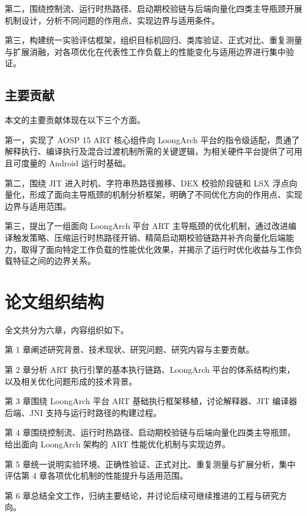 第二，围绕控制流、运行时热路径、启动期校验链与后端向量化四类主导瓶颈开展机制设计，分析不同问题的作用点、实现边界与适用条件。

第三，构建统一实验评估框架，组织目标机回归、类库验证、正式对比、重复测量与扩展消融，对各项优化在代表性工作负载上的性能变化与适用边界进行集中验证。

\subsection{主要贡献}

本文的主要贡献体现在以下三个方面。

第一，实现了 AOSP 15 ART 核心组件向 LoongArch 平台的指令级适配，贯通了解释执行、编译执行及混合过渡机制所需的关键逻辑，为相关硬件平台提供了可用且可度量的 Android 运行时基础。

第二，围绕 JIT 进入时机、字符串热路径搬移、DEX 校验阶段链和 LSX 浮点向量化，形成了面向主导瓶颈的机制分析框架，明确了不同优化方向的作用点、实现边界与适用范围。

第三，提出了一组面向 LoongArch 平台 ART 主导瓶颈的优化机制，通过改进编译触发策略、压缩运行时热路径开销、精简启动期校验链路并补齐向量化后端能力，取得了面向特定工作负载的性能优化效果，并揭示了运行时优化收益与工作负载特征之间的边界关系。

\section{论文组织结构}

全文共分为六章，内容组织如下。

第 1 章阐述研究背景、技术现状、研究问题、研究内容与主要贡献。

第 2 章分析 ART 执行引擎的基本执行链路、LoongArch 平台的体系结构约束，以及相关优化问题形成的技术背景。

第 3 章围绕 LoongArch 平台 ART 基础执行框架移植，讨论解释器、JIT 编译器后端、JNI 支持与运行时路径的构建过程。

第 4 章围绕控制流、运行时热路径、启动期校验链与后端向量化四类主导瓶颈，给出面向 LoongArch 架构的 ART 性能优化机制与实现边界。

第 5 章统一说明实验环境、正确性验证、正式对比、重复测量与扩展分析，集中评估第 4 章各项优化机制的性能提升与适用范围。

第 6 章总结全文工作，归纳主要结论，并讨论后续可继续推进的工程与研究方向。
